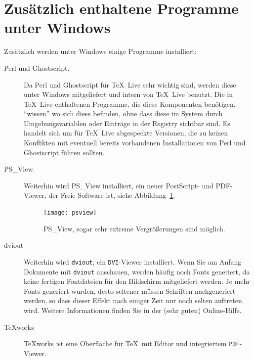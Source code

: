 \documentclass[12pt,ngerman,a4paper,fullparskip]{report}
\newcommand{\TL}{\TeX\ Live\xspace}
\newcommand{\acro}[1]{\texttt{#1}}
\newcommand{\cmdname}[1]{\texttt{#1}}
\newcommand{\prog}[1]{\texttt{#1}}
\begin{document}
\section{Zusätzlich enthaltene Programme unter Windows}

Zusätzlich werden unter Windows einige Programme installiert:

\begin{description}
\item[Perl und Ghostscript.] Da Perl und Ghostscript für \TL sehr wichtig sind, werden diese   unter Windows mitgeliefert und intern von \TL benutzt. Die in \TL enthaltenen Programme, die diese Komponenten benötigen, \enquote{wissen} wo sich diese befinden, ohne dass diese im System durch  Umgebungsvariablen oder Einträge in der Registry sichtbar sind. Es handelt sich um für \TL abgespeckte Versionen, die zu keinen Konflikten mit eventuell bereits vorhandenen Installationen von Perl und Ghostscript führen sollten.

\item[PS\_View.] Weiterhin wird PS\_View installiert, ein neuer PostScript- und PDF-Viewer, der Freie Software ist, siehe Abbildung~\ref{fig:psview}.

\begin{figure}[tb]
\begin{center}
\texttt{[image: psview]}
\caption{PS\_View, sogar sehr extreme Vergrößerungen sind möglich.}\label{fig:psview}
\end{center}
\end{figure}

\item[dviout] Weiterhin wird \prog{dviout}, ein \acro{DVI}-Viewer installiert.
Wenn Sie am Anfang Dokumente mit \cmdname{dviout} anschauen, werden häufig noch Fonts generiert, da keine fertigen Fontdateien für den Bildschirm mitgeliefert werden. Je mehr Fonts generiert wurden, desto seltener müssen Schriften nachgeneriert werden, so dass dieser Effekt nach einiger Zeit nur noch selten auftreten wird. Weitere Informationen finden Sie in der (sehr guten) Online-Hilfe. \enlargethispage{1cm}

\item[TeXworks] \TeX{}works ist eine Oberfläche für \TeX\ mit Editor und
   integriertem \acro{PDF}-Viewer.


\end{description}
\end{document}
